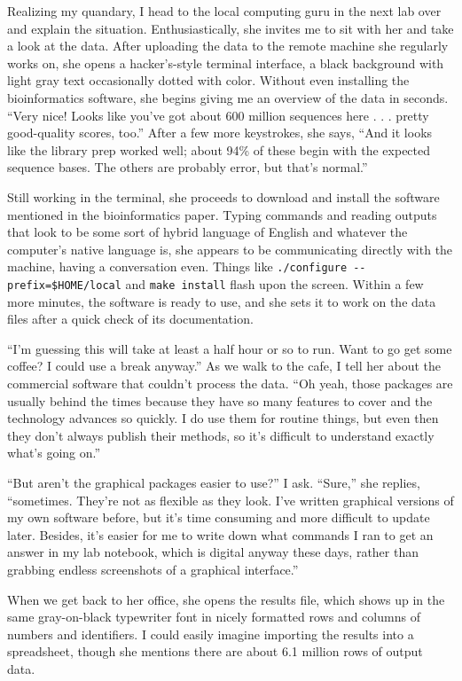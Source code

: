 \documentclass[
]{memoir}
\begin{document}
Realizing my quandary, I head to the local computing guru in the next lab over and explain the situation. Enthusiastically, she invites me to sit with her and take a look at the data. After uploading the data to the remote machine she regularly works on, she opens a hacker's-style terminal interface, a black background with light gray text occasionally dotted with color. Without even installing the bioinformatics software, she begins giving me an overview of the data in seconds. \enquote{Very nice! Looks like you've got about 600 million sequences here . . . pretty good-quality scores, too.} After a few more keystrokes, she says, \enquote{And it looks like the library prep worked well; about 94\% of these begin with the expected sequence bases. The others are probably error, but that's normal.}

Still working in the terminal, she proceeds to download and install the software mentioned in the bioinformatics paper. Typing commands and reading outputs that look to be some sort of hybrid language of English and whatever the computer's native language is, she appears to be communicating directly with the machine, having a conversation even. Things like \texttt{./configure\ -\/-prefix=\$HOME/local} and \texttt{make\ install} flash upon the screen. Within a few more minutes, the software is ready to use, and she sets it to work on the data files after a quick check of its documentation.

\enquote{I'm guessing this will take at least a half hour or so to run. Want to go get some coffee? I could use a break anyway.} As we walk to the cafe, I tell her about the commercial software that couldn't process the data. \enquote{Oh yeah, those packages are usually behind the times because they have so many features to cover and the technology advances so quickly. I do use them for routine things, but even then they don't always publish their methods, so it's difficult to understand exactly what's going on.}

\enquote{But aren't the graphical packages easier to use?} I ask. \enquote{Sure,} she replies, \enquote{sometimes. They're not as flexible as they look. I've written graphical versions of my own software before, but it's time consuming and more difficult to update later. Besides, it's easier for me to write down what commands I ran to get an answer in my lab notebook, which is digital anyway these days, rather than grabbing endless screenshots of a graphical interface.}

When we get back to her office, she opens the results file, which shows up in the same gray-on-black typewriter font in nicely formatted rows and columns of numbers and identifiers. I could easily imagine importing the results into a spreadsheet, though she mentions there are about 6.1 million rows of output data.
\end{document}
